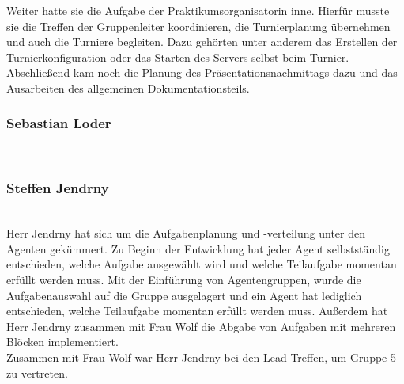 Weiter hatte sie die Aufgabe der Praktikumsorganisatorin inne. Hierfür musste sie die Treffen der Gruppenleiter koordinieren, die Turnierplanung übernehmen und auch die Turniere begleiten. Dazu gehörten unter anderem das Erstellen der Turnierkonfiguration oder das Starten des Servers selbst beim Turnier. Abschließend kam noch die Planung des Präsentationsnachmittags dazu und das Ausarbeiten des allgemeinen Dokumentationsteils.

\subsubsection{Sebastian Loder} ~\\
\subsubsection{Steffen Jendrny} ~\\
Herr Jendrny hat sich um die Aufgabenplanung und -verteilung unter den Agenten gekümmert. Zu Beginn der Entwicklung hat jeder Agent selbstständig entschieden, welche Aufgabe ausgewählt wird und welche Teilaufgabe momentan erfüllt werden muss. Mit der Einführung von Agentengruppen, wurde die Aufgabenauswahl auf die Gruppe ausgelagert und ein Agent hat lediglich entschieden, welche Teilaufgabe momentan erfüllt werden muss. Außerdem hat Herr Jendrny zusammen mit Frau Wolf die Abgabe von Aufgaben mit mehreren Blöcken implementiert. \\
Zusammen mit Frau Wolf war Herr Jendrny bei den Lead-Treffen, um Gruppe 5 zu vertreten.